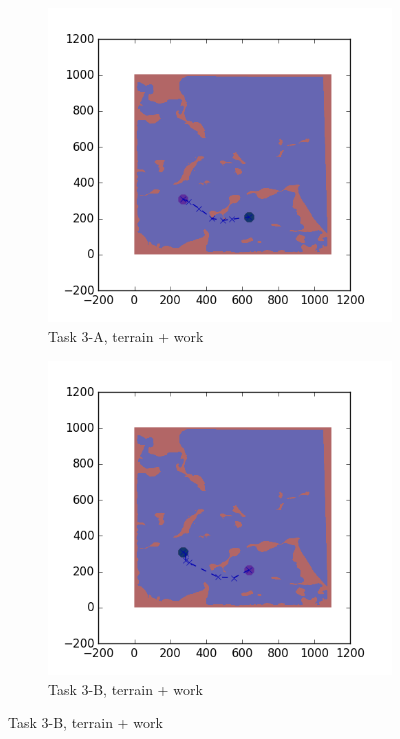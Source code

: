 \documentclass{tamuccthesis}
\begin{document}
\begin{figure}
    \begin{subfigure}[b]{0.4\textwidth}
        \centering
        \includegraphics[width=\textwidth,trim={4cm 3cm 2cm 3cm},clip]{EXP3RG_PathCa_-1_-1_-1_0.png}
        \caption[]{{\small Task 3-A, terrain + work}}    
        \label{fig:Path_3-A_terrain_work}
    \end{subfigure}
    \hfill
    \begin{subfigure}[b]{0.4\textwidth}  
        \centering 
        \includegraphics[width=\textwidth,trim={4cm 3cm 2cm 3cm},clip]{EXP3RG_PathCb_-1_-1_-1_0.png}
        \caption[]{{\small Task 3-B, terrain + work}}   
        \label{fig:Path_3-B_terrain_work}
    \end{subfigure}


\end{figure}
\end{document}
